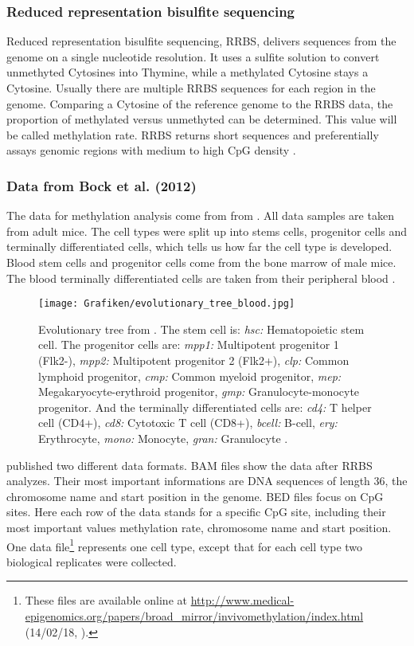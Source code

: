 \documentclass[12pt]{article} %
\begin{document}
	\subsubsection{Reduced representation bisulfite sequencing}
	Reduced representation bisulfite sequencing, RRBS, delivers sequences from the genome on a single nucleotide resolution. It uses a sulfite solution to convert unmethyted Cytosines into Thymine, while a methylated Cytosine stays a Cytosine.
	Usually there are multiple RRBS sequences for each region in the genome. Comparing a Cytosine of the reference genome to the RRBS data, the proportion of methylated versus unmethyted can be determined. This value will be called methylation rate. RRBS returns short sequences and preferentially assays genomic regions with medium to high CpG density \citep{bock2012}. 
	
	\subsubsection{Data from Bock et al. (2012)}
	The data for methylation analysis come from from \cite{bock2012}. All data samples are taken from adult mice. The cell types were split up into stems cells, progenitor cells and terminally differentiated cells, which tells us how far the cell type is developed. Blood stem cells and progenitor cells come from the bone marrow of male mice. The blood terminally differentiated cells are taken from their peripheral blood \citep{bock2012}.\\
	\begin{figure}[h]
		\raggedright
		\texttt{[image: Grafiken/evolutionary\_tree\_blood.jpg]}
		\caption{Evolutionary tree from \cite{capra2014}. The stem cell is: \textit{hsc:} Hematopoietic stem cell. The progenitor cells are: \textit{mpp1:} Multipotent progenitor 1 (Flk2-), \textit{mpp2:} Multipotent progenitor 2 (Flk2+), \textit{clp:} Common lymphoid progenitor, \textit{cmp:} Common myeloid progenitor, \textit{mep:} Megakaryocyte-erythroid progenitor, \textit{gmp:} Granulocyte-monocyte progenitor. And the terminally differentiated cells are: \textit{cd4:} T helper cell (CD4+), \textit{cd8:} Cytotoxic T cell (CD8+), \textit{bcell:} B-cell, \textit{ery:} Erythrocyte, \textit{mono:} Monocyte, \textit{gran:} Granulocyte \citep{bock2012}.}
		\label{img:evolutionary_tree_blood}
	\end{figure}

	\cite{bock2012} published two different data formats. BAM files show the data after RRBS analyzes. Their most important informations are DNA sequences of length 36, the chromosome name and start position in the genome. BED files focus on CpG sites. Here each row of the data stands for a specific CpG site, including their most important values methylation rate, chromosome name and start position. One data file\footnote{These files are available online at \url{http://www.medical-epigenomics.org/papers/broad_mirror/invivomethylation/index.html} (14/02/18, \cite{bock2012}).} represents one cell type, except that for each cell type two biological replicates were collected.
	
\end{document}
